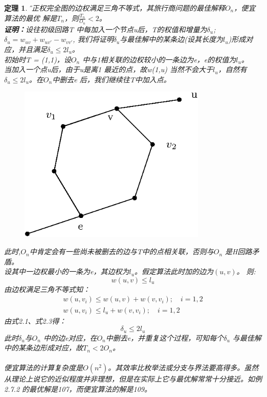 \documentclass[11pt,a4paper,openany]{book}
\newtheorem{theorem}{\textbf{定理}}[section]
\begin{document}
\begin{theorem}\H
设正权完全图的边权满足三角不等式，其旅行商问题的最佳解释$O_n$，便宜算法的最优
解是$T_n$，则$\frac{T_n}{O_n} < 2$。\\
\textbf{证明：}设往初级回路T 中每加入一个节点u后，T的权值和增量为$\delta_u$; $\delta_u=w_{uv} +w_{uv'} −w_{vv'}$,
我们将证明$\delta_u$与最佳解中的某条边(设其长度为$l_u$)形成对应，并且满足$\delta_u\leq2l_u$。\\
\indent 初始时T = {(1,1)}，设$O_n$ 中与1相关联的边权较小的一条边为e，e的权值为$l_u$。\\
当加入一个点u后，由于u是离1 最近的点，故w(1,u) 当然不会大于$l_u$，自然有$\delta_u\leq2l_u$。在$O_n$中删去e 后，我们继续往T中加入点。\\
\begin{figure}[H]
  \centering
  \includegraphics[width=0.8\textwidth]{2_20.eps}
  \caption{}
\end{figure}
\indent 此时,$O_n$中肯定会有一些尚未被删去的边与T中的点相关联，否则与$O_n$ 是H回路矛盾。\\
设其中一边权最小的一条为e，其边权为$l_u$。假定算法此时加的边为$(u,v)$。 则:
\begin{equation}
  w(u,v)\leq l_u
\end{equation}
由边权满足三角不等式知：\\
\begin{gather}
  w(u,v_i)\leq w(u,v) + w(v,v_i); \quad i = 1, 2\\
  w(u,v_i) \leq l_u + w(v,v_i); \quad i = 1,2
\end{gather}
由式2.1、式2.3得：
\begin{equation}
  \delta_u \leq 2l_u
\end{equation}
\indent 此时$\delta_u $与$O_n$ 中的边e对应，在$O_n$中删去e，并重复这个过程，可知每个$\delta_u$ 与最佳解
中的某条边形成对应，故$T_n < 2O_n$。
\paragraph{}便宜算法的计算复杂度是$O(n^2)$。其效率比枚举法或分支与界法要高得多。虽然从理论上说它的近似程度并非理想，但是在实际上它与最优解常常十分接近。如例2.7.2 的最优解是107，而便宜算法的解是109。
\end{theorem}
\end{document}
